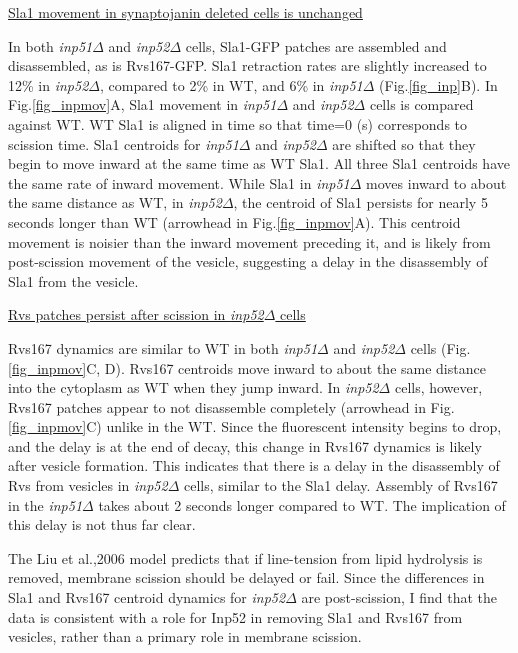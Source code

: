 	

\underline{Sla1 movement in synaptojanin deleted cells is unchanged}

In both \textit{inp51$\Delta$} and \textit{inp52$\Delta$} cells, Sla1-GFP patches are assembled and disassembled, as is Rvs167-GFP. Sla1 retraction rates are slightly increased to 12\% in \textit{inp52$\Delta$}, compared to 2\% in WT, and 6\% in \textit{inp51$\Delta$}
(Fig.\ref{fig_inp}B).  In Fig.\ref{fig_inpmov}A, Sla1 movement in \textit{inp51$\Delta$} and \textit{inp52$\Delta$}
 cells is compared against WT. WT Sla1 is aligned in time so that time=0 (s) corresponds to scission time. Sla1 centroids for \textit{inp51$\Delta$} and \textit{inp52$\Delta$} are shifted so that they begin to move inward at the same time as WT Sla1. All three Sla1 centroids have the same rate of inward movement. While Sla1 in \textit{inp51$\Delta$} moves inward to about the same distance as WT, in \textit{inp52$\Delta$}, the centroid of Sla1 persists for nearly 5 seconds longer than WT (arrowhead in Fig.\ref{fig_inpmov}A). This centroid movement is noisier than the inward movement preceding it, and is likely from post-scission movement of the vesicle, suggesting a delay in the disassembly of Sla1 from the vesicle. 


\vspace{5mm}	
\underline{Rvs patches persist after scission in \textit{inp52$\Delta$} cells }

Rvs167 dynamics are similar to WT in both \textit{inp51$\Delta$}
 and \textit{inp52$\Delta$} cells (Fig.\ref{fig_inpmov}C, D). Rvs167 centroids move inward to about the same distance into the cytoplasm as WT when they jump inward. In \textit{inp52$\Delta$} cells, however, Rvs167 patches appear to not disassemble completely (arrowhead in Fig.\ref{fig_inpmov}C) unlike in the WT. Since the fluorescent intensity begins to drop, and the delay is at the end of decay, this change in Rvs167 dynamics is likely after vesicle formation. This indicates that there is a delay in the disassembly of Rvs from vesicles in \textit{inp52$\Delta$} cells, similar to the Sla1 delay. Assembly of Rvs167 in the \textit{inp51$\Delta$}
 takes about 2 seconds longer compared to WT. The implication of this delay is not thus far clear. 

	\vspace{5mm}
The Liu et al.,2006 model predicts that if line-tension from lipid hydrolysis is removed, membrane scission should be delayed or fail. Since the differences in Sla1 and Rvs167 centroid dynamics for \textit{inp52$\Delta$} are post-scission, I find that the data is consistent with a role for Inp52 in removing Sla1 and Rvs167 from vesicles, rather than a primary role in membrane scission. 

